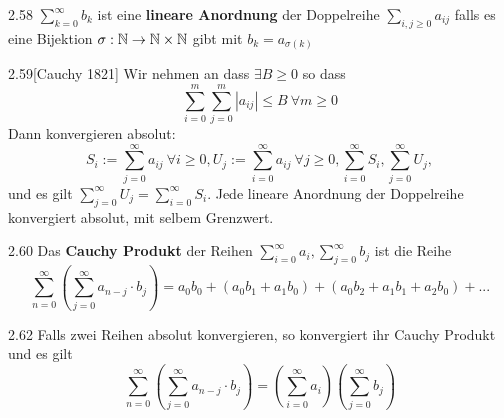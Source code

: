 \begin{definition}{2.58}
    $\sum_{k=0}^\infty b_k$ ist eine \textbf{lineare Anordnung} der Doppelreihe $\sum_{i,j \ge 0} a_{ij}$ falls es
    eine Bijektion $\sigma : \mathbb{N} \to \mathbb{N} \times \mathbb{N}$ gibt mit $b_k = a_{\sigma(k)}$
\end{definition}

\begin{satz}{2.59}[Cauchy 1821]
    Wir nehmen an dass $\exists B \ge 0$ so dass
    \[ \sum_{i=0}^m \sum_{j=0}^m |a_{ij}| \le B\ \forall m \ge 0 \]
    Dann konvergieren absolut:
    \[
        S_i := \sum_{j=0}^\infty a_{ij}\ \forall i \ge 0,
        U_j := \sum_{i=0}^\infty a_{ij}\ \forall j \ge 0,
        \sum_{i=0}^\infty S_i,
        \sum_{j=0}^\infty U_j,
    \]
    und es gilt $\sum_{j=0}^\infty U_j = \sum_{i=0}^\infty S_i$.
    Jede lineare Anordnung der Doppelreihe konvergiert absolut, mit selbem Grenzwert.
\end{satz}

\begin{definition}{2.60}
    Das \textbf{Cauchy Produkt} der Reihen $\sum_{i=0}^\infty a_i, \sum_{j=0}^\infty b_j$
    ist die Reihe
    \[ \sum_{n=0}^\infty \left( \sum_{j=0}^\infty a_{n-j} \cdot b_j \right) = a_0b_0 + (a_0b_1 + a_1b_0) + (a_0b_2 + a_1b_1 + a_2b_0) + ... \]
\end{definition}
\begin{satz}{2.62}
    Falls zwei Reihen absolut konvergieren, so konvergiert ihr Cauchy Produkt und es gilt
    \[ \sum_{n=0}^\infty \left( \sum_{j=0}^\infty a_{n-j} \cdot b_j \right) = \left( \sum_{i=0}^\infty a_i \right) \left( \sum_{j=0}^\infty b_j \right)\]
\end{satz}

